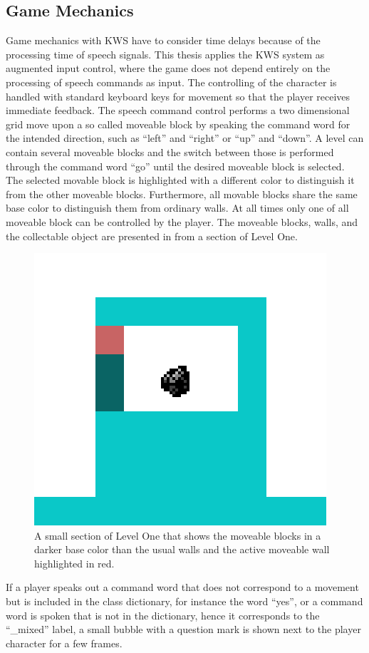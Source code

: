 \subsection{Game Mechanics}\label{sec:game_design_mechanics}
Game mechanics with KWS have to consider time delays because of the processing time of speech signals.
This thesis applies the KWS system as augmented input control, where the game does not depend entirely on the processing of speech commands as input.
The controlling of the character is handled with standard keyboard keys for movement so that the player receives immediate feedback. 
The speech command control performs a two dimensional grid move upon a so called moveable block by speaking the command word for the intended direction, such as \enquote{left} and \enquote{right} or \enquote{up} and \enquote{down}.
A level can contain several moveable blocks and the switch between those is performed through the command word \enquote{go} until the desired moveable block is selected.
The selected movable block is highlighted with a different color to distinguish it from the other moveable blocks.
Furthermore, all movable blocks share the same base color to distinguish them from ordinary walls.
At all times only one of all moveable block can be controlled by the player.
The moveable blocks, walls, and the collectable object are presented in  from a section of Level One.
\begin{figure}[!ht]
  \centering
  \includegraphics[height=0.25\textwidth]{./6_game/figs/game_design_mechanic_thing.png}
  \caption{A small section of Level One that shows the moveable blocks in a darker base color than the usual walls and the active moveable wall highlighted in red.}
  \label{fig:game_design_mechanic_thing}
\end{figure}
\FloatBarrier
\noindent
If a player speaks out a command word that does not correspond to a movement but is included in the class dictionary, for instance the word \enquote{yes}, or a command word is spoken that is not in the dictionary, hence it corresponds to the \enquote{\_mixed} label, a small bubble with a question mark is shown next to the player character for a few frames.
